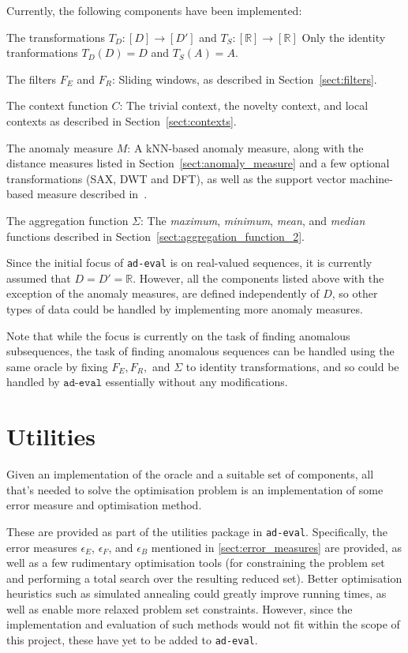 Currently, the following components have been implemented:
\begin{description}
    \item{The transformations $T_D: [D] \rightarrow [D']$ and $T_S: [\mathbb{R}] \rightarrow [\mathbb{R}]$} Only the identity tranformations $T_D(D) = D$ and $T_S(A) = A$.
    \item{The filters $F_E$ and $F_R$:} Sliding windows, as described in Section~\ref{sect:filters}.
    \item{The context function $C$:} The trivial context, the novelty context, and local contexts as described in Section~\ref{sect:contexts}.
    \item{The anomaly measure $M$:} A kNN-based anomaly measure, along with the distance measures listed in Section~\ref{sect:anomaly_measure} and a few optional transformations (SAX, DWT and DFT), as well as the support vector machine-based measure described in~\cite{chandola3}.
    \item{The aggregation function $\Sigma$:} The \emph{maximum}, \emph{minimum}, \emph{mean}, and \emph{median} functions described in Section~\ref{sect:aggregation_function_2}.
\end{description}

Since the initial focus of \texttt{ad-eval} is on real-valued sequences, it is currently assumed that $D = D' = \mathbb{R}$. However, all the components listed above with the exception of the anomaly measures, are defined independently of $D$, so other types of data could be handled by implementing more anomaly measures.

Note that while the focus is currently on the task of finding anomalous subsequences, the task of finding anomalous sequences can be handled using the same oracle by fixing $F_E, F_R,$ and $\Sigma$ to identity transformations, and so could be handled by $\texttt{ad-eval}$ essentially without any modifications.

\section{Utilities}

Given an implementation of the oracle and a suitable set of components, all that's needed to solve the optimisation problem is an implementation of some error measure and optimisation method.

These are provided as part of the utilities package in \texttt{ad-eval}. Specifically, the error measures $\epsilon_{E}$, $\epsilon_{F}$, and $\epsilon_{B}$ mentioned in \ref{sect:error_measures} are provided, as well as a few rudimentary optimisation tools (for constraining the problem set and performing a total search over the resulting reduced set). Better optimisation heuristics such as simulated annealing could greatly improve running times, as well as enable more relaxed problem set constraints. However, since the implementation and evaluation of such methods would not fit within the scope of this project, these have yet to be added to \texttt{ad-eval}.

